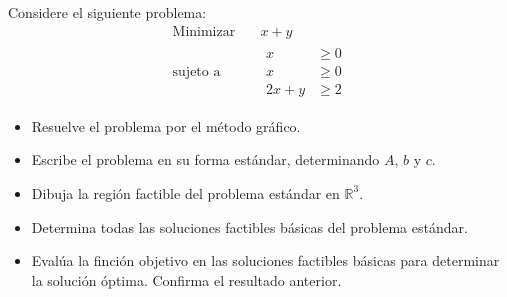 \documentclass{article}
\begin{document}
Considere el siguiente problema:
\begin{equation*}
  \begin{aligned}
    \text{Minimizar}\quad & x+y \\
    \text{sujeto a}\quad  &
    \begin{aligned}
      x & \geq 0\\
      x & \geq 0\\
      2x+y & \geq 2
    \end{aligned}
  \end{aligned}
\end{equation*}

\begin{itemize}
 \item Resuelve el problema por el método gráfico.
 \item Escribe el problema en su forma estándar, determinando $A$, $b$ y $c$.
 \item Dibuja la región factible del problema estándar en $\mathbb{R}^3$.
 \item Determina todas las soluciones factibles básicas del problema estándar.
 \item Evalúa la finción objetivo en las soluciones factibles básicas para determinar la solución óptima. Confirma el resultado anterior. 
\end{itemize}
\end{document}
